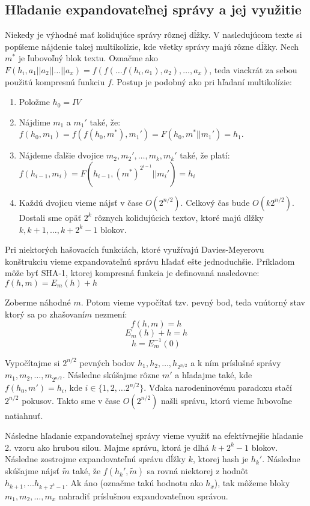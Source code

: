 \subsection{Hľadanie expandovateľnej správy a jej využitie}

Niekedy je výhodné mať kolidujúce správy rôznej dĺžky. 
V nasledujúcom texte si popíšeme nájdenie takej multikolízie,
kde všetky správy majú rôzne dĺžky. Nech $m^*$ je ľubovoľný
blok textu. 
Označme ako $F(h_i, a_1||a_2||\dots||a_x) = f(f(\dots f(h_i, a_1), a_2), \dots, a_x)$,
teda viackrát za sebou použitú kompresnú funkciu $f$.
Postup je podobný ako pri hľadaní multikolízie:
\begin{enumerate}
\itemsep -1.2mm
\item Položme $h_0 = IV$
\item Nájdime $m_1$ a $m_1'$ také, že: $f(h_0, m_1) = f(f(h_0, m^*), m_1') = F(h_0, m^*||m_1') = h_1$. 
\item Nájdeme ďalšie dvojice $m_2, m_2', \dots, m_k, m_k'$ také, že platí:
$f(h_{i-1}, m_i) = F(h_{i-1}, (m^*)^{2^{i-1}}||m_i') = h_i$
\item Každú dvojicu vieme nájsť v čase $O(2^{n/2})$. Celkový čas bude $O(k 2^{n/2})$.
Dostali sme opäť $2^k$ rôznych kolidujúcich textov, ktoré majú dlžky $k, k+1, \dots, k+2^k-1$ blokov.
\end{enumerate}


Pri niektorých hašovacích funkciách, ktoré využívajú
Davies-Meyerovu konštrukciu vieme expandovateľnú správu hľadať
ešte jednoduchšie. Príkladom môže byť SHA-1, ktorej kompresná funkcia
je definovaná nasledovne:
$f(h, m) = E_m(h)+h$

Zoberme náhodné $m$. Potom vieme vypočítať tzv. pevný bod, teda vnútorný
stav ktorý sa po \clqq zhašovaní\crqq $m$ nezmení:
$$f(h,m) = h$$
$$E_m(h) + h= h$$
$$h = E_m^{-1}(0)$$

Vypočítajme si $2^{n/2}$ pevných bodov $h_1, h_2, \dots, h_{2^{n/2}}$ a k ním príslušné správy
$m_1, m_2, \dots, m_{2^{n/2}}$. 
Následne skúšajme rôzne $m'$ a hľadajme také, kde $f(h_0, m') = h_i$, kde $i \in \{1, 2, \dots 2^{n/2}\}$.
Vďaka narodeninovému paradoxu stačí $2^{n/2}$ pokusov. Takto sme v čase $O(2^{n/2})$ našli správu, ktorú
vieme ľubovoľne natiahnuť.

Následne hľadanie expandovateľnej správy vieme využiť na efektívnejšie hľadanie 2. vzoru ako hrubou silou.
Majme správu, ktorá je dlhá $k + 2^k - 1$ blokov. Následne zostrojme expandovateľnú správu dĺžky $k$, ktorej hash je $h_k'$.
Následne skúšajme nájsť  $\tilde{m}$ také, že $f(h_k', \tilde{m})$ sa rovná niektorej z hodnôt $h_{k+1}, \dots h_{k+2^k-1}$. Ak áno 
(označme takú hodnotu ako $h_x$), tak môžeme bloky $m_1, m_2, \dots, m_x$ nahradiť príslušnou expandovateľnou správou.

